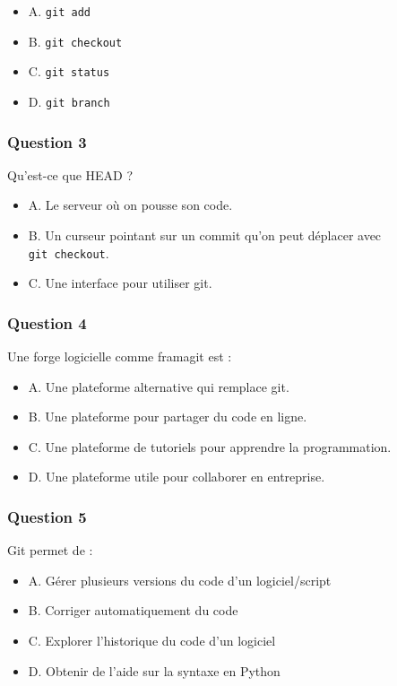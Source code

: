 \documentclass[]{article}
\providecommand{\tightlist}{%
  \setlength{\itemsep}{0pt}\setlength{\parskip}{0pt}}
\begin{document}
\begin{itemize}
\tightlist
\item
  A. \texttt{git\ add}
\item
  B. \texttt{git\ checkout}
\item
  C. \texttt{git\ status}
\item
  D. \texttt{git\ branch}
\end{itemize}

\hypertarget{question-3}{%
\subsubsection{Question 3}\label{question-3}}

Qu'est-ce que HEAD ?

\begin{itemize}
\tightlist
\item
  A. Le serveur où on pousse son code.
\item
  B. Un curseur pointant sur un commit qu'on peut déplacer avec
  \texttt{git\ checkout}.
\item
  C. Une interface pour utiliser git.
\end{itemize}

\hypertarget{question-4}{%
\subsubsection{Question 4}\label{question-4}}

Une forge logicielle comme framagit est :

\begin{itemize}
\tightlist
\item
  A. Une plateforme alternative qui remplace git.
\item
  B. Une plateforme pour partager du code en ligne.
\item
  C. Une plateforme de tutoriels pour apprendre la programmation.
\item
  D. Une plateforme utile pour collaborer en entreprise.
\end{itemize}

\hypertarget{question-5}{%
\subsubsection{Question 5}\label{question-5}}

Git permet de :

\begin{itemize}
\tightlist
\item
  A. Gérer plusieurs versions du code d'un logiciel/script
\item
  B. Corriger automatiquement du code
\item
  C. Explorer l'historique du code d'un logiciel
\item
  D. Obtenir de l'aide sur la syntaxe en Python
\end{itemize}
\end{document}
